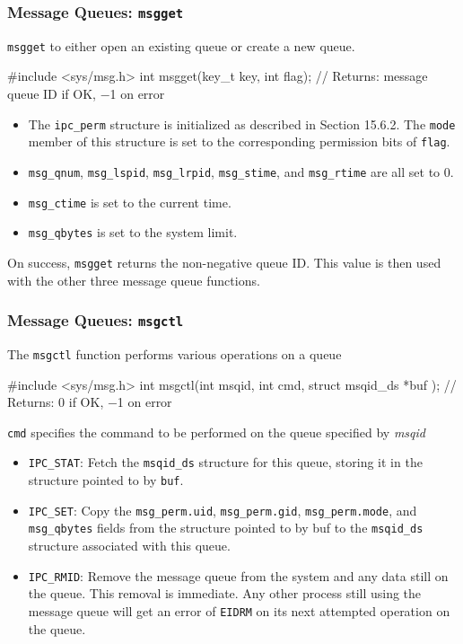 \documentclass[newPxFont,sthlmFooter,nooffset]{beamer}
\begin{document}
\begin{frame}[t, fragile]
  \frametitle{Message Queues: \texttt{msgget}}
\texttt{msgget} to either open an existing queue or create a new queue.

\begin{codedef}
#include <sys/msg.h>
int msgget(key_t key, int flag);
// Returns: message queue ID if OK, −1 on error
\end{codedef}
{\footnotesize
\begin{itemize}
\item The \texttt{ipc\_perm} structure is initialized as described in Section 15.6.2. The \texttt{mode} member of this structure is set to the corresponding permission bits of \texttt{flag}. 
\item  \texttt{msg\_qnum}, \texttt{msg\_lspid}, \texttt{msg\_lrpid}, \texttt{msg\_stime}, and \texttt{msg\_rtime} are all set to 0.
\item \texttt{msg\_ctime} is set to the current time.
\item \texttt{msg\_qbytes} is set to the system limit.
\end{itemize}
}
On success, \texttt{msgget} returns the non-negative queue ID. This value is then used with the other three message queue functions.
\end{frame}



\begin{frame}[t, fragile]
  \frametitle{Message Queues: \texttt{msgctl}}
The \texttt{msgctl} function performs various operations on a queue
\begin{codedef}
#include <sys/msg.h>
int msgctl(int msqid, int cmd, struct msqid_ds *buf );
// Returns: 0 if OK, −1 on error
\end{codedef}
{\footnotesize
\texttt{cmd} specifies the command to be performed on the queue specified by \textit{msqid}
\begin{itemize}
\item \texttt{IPC\_STAT}: Fetch the \texttt{msqid\_ds} structure for this queue, storing it in the structure pointed to by \texttt{buf}.
\item \texttt{IPC\_SET}:  Copy the \texttt{msg\_perm.uid}, \texttt{msg\_perm.gid}, \texttt{msg\_perm.mode}, and \texttt{msg\_qbytes} fields from the structure pointed to by buf to the \texttt{msqid\_ds} structure associated with this queue. 
\item \texttt{IPC\_RMID}: Remove the message queue from the system and any data still on the queue. This removal is immediate. Any other process still using the message queue will get an error of \texttt{EIDRM} on its next attempted operation on the queue.
\end{itemize}
}
\end{frame}
\end{document}
